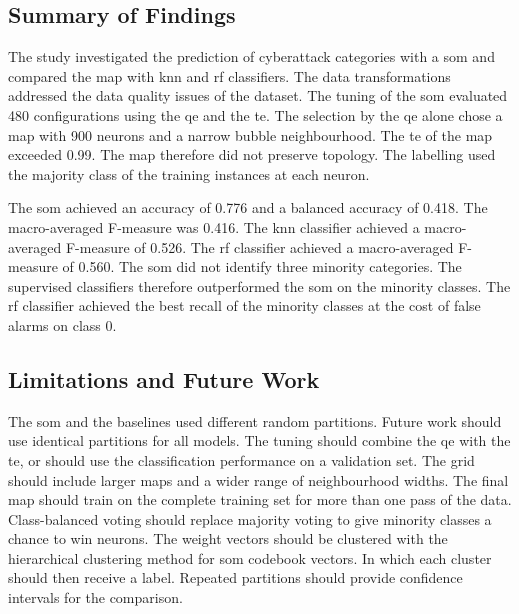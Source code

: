 \documentclass[conference]{IEEEtran}
\begin{document}
\subsection{Summary of Findings}

The study investigated the prediction of cyberattack categories with a \gls{som} and compared the map with \gls{knn} and \gls{rf} classifiers.
The data transformations addressed the data quality issues of the dataset.
The tuning of the \gls{som} evaluated 480 configurations using the \gls{qe} and the \gls{te}.
The selection by the \gls{qe} alone chose a map with 900 neurons and a narrow bubble neighbourhood.
The \gls{te} of the map exceeded 0.99.
The map therefore did not preserve topology.
The labelling used the majority class of the training instances at each neuron.

The \gls{som} achieved an accuracy of 0.776 and a balanced accuracy of 0.418.
The macro-averaged F-measure was 0.416.
The \gls{knn} classifier achieved a macro-averaged F-measure of 0.526.
The \gls{rf} classifier achieved a macro-averaged F-measure of 0.560.
The \gls{som} did not identify three minority categories.
The supervised classifiers therefore outperformed the \gls{som} on the minority classes.
The \gls{rf} classifier achieved the best recall of the minority classes at the cost of false alarms on class 0.

\subsection{Limitations and Future Work}

The \gls{som} and the baselines used different random partitions.
Future work should use identical partitions for all models.
The tuning should combine the \gls{qe} with the \gls{te}, or should use the classification performance on a validation set.
The grid should include larger maps and a wider range of neighbourhood widths.
The final map should train on the complete training set for more than one pass of the data.
Class-balanced voting should replace majority voting to give minority classes a chance to win neurons.
The weight vectors should be clustered with the hierarchical clustering method for \gls{som} codebook vectors.
In which each cluster should then receive a label.
Repeated partitions should provide confidence intervals for the comparison.

\end{document}
